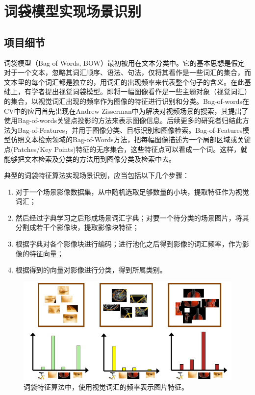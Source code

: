 \documentclass{article}
\begin{document}
\section{词袋模型实现场景识别}
\subsection{项目细节}
词袋模型（Bag of Words, BOW）最初被用在文本分类中。它的基本思想是假定对于一个文本，忽略其词汇顺序、语法、句法，仅将其看作是一些词汇的集合，而文本里的每个词汇都是独立的，用词汇的出现频率来代表整个句子的含义。在此基础上，有学者提出视觉词袋模型。即将一幅图像看作是一些主题对象（视觉词汇）的集合，以视觉词汇出现的频率作为图像的特征进行识别和分类。Bag-of-words在CV中的应用首先出现在Andrew Zisserman中为解决对视频场景的搜索，其提出了使用Bag-of-words关键点投影的方法来表示图像信息。后续更多的研究者归结此方法为Bag-of-Features，并用于图像分类、目标识别和图像检索。Bag-of-Features模型仿照文本检索领域的Bag-of-Words方法，把每幅图像描述为一个局部区域或关键点(Patches/Key Points)特征的无序集合，这些特征点可以看成一个词。这样，就能够把文本检索及分类的方法用到图像分类及检索中去。

\begin{question}
    典型的词袋特征算法实现场景识别，应当包括以下几个步骤：
    \begin{enumerate}
        \item 对于一个场景影像数据集，从中随机选取足够数量的小块，提取特征作为视觉词汇；
        \item 然后经过字典学习之后形成场景词汇字典；对要一个待分类的场景图片，将其分割成若干个影像块，提取影像块特征；
        \item 根据字典对各个影像块进行编码；进行池化之后得到影像的词汇频率，作为影像的特征向量；
        \item 根据得到的向量对影像进行分类，得到所属类别。
    \end{enumerate}
\end{question}

\begin{figure}[h]
    \centering
    \includegraphics[width=\textwidth]{./project3/bow.png}
    \caption{词袋特征算法中，使用视觉词汇的频率表示图片特征。}
\end{figure}
\end{document}
